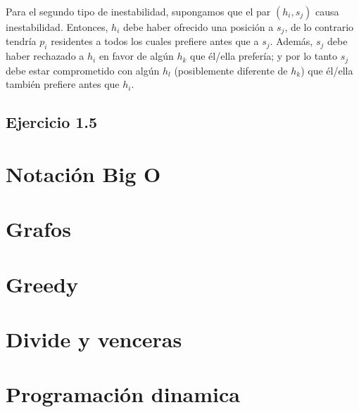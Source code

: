 \documentclass{article}
\begin{document}
Para el segundo tipo de inestabilidad, supongamos que el par $(h_i, s_j)$ causa inestabilidad. Entonces, $h_i$ debe haber ofrecido una posición a $s_j$, de lo contrario tendría $p_i$ residentes a todos los cuales prefiere antes que a $s_j$. Además, $s_j$ debe haber rechazado a $h_i$ en favor de algún $h_k$ que él/ella prefería; y por lo tanto $s_j$ debe estar comprometido con algún $h_l$ (posiblemente diferente de $h_k$) que él/ella también prefiere antes que $h_i$.

\subsection{Ejercicio 1.5}

\newpage





\section{Notación Big O}
\section{Grafos}
\section{Greedy}
\section{Divide y venceras}
\section{Programación dinamica}
\end{document}
